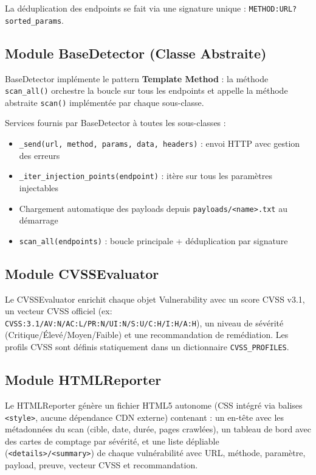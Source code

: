 \documentclass[12pt,a4paper]{report}
\newcommand{\code}[1]{\texttt{#1}}
\begin{document}
La déduplication des endpoints se fait via une signature unique :
\code{METHOD:URL?sorted\_params}.

\subsection{Module BaseDetector (Classe Abstraite)}

BaseDetector implémente le pattern \textbf{Template Method} : la méthode \code{scan\_all()}
orchestre la boucle sur tous les endpoints et appelle la méthode abstraite \code{scan()}
implémentée par chaque sous-classe.

Services fournis par BaseDetector à toutes les sous-classes :
\begin{itemize}
  \item \code{\_send(url, method, params, data, headers)} : envoi HTTP avec gestion des erreurs
  \item \code{\_iter\_injection\_points(endpoint)} : itère sur tous les paramètres injectables
  \item Chargement automatique des payloads depuis \code{payloads/<name>.txt} au démarrage
  \item \code{scan\_all(endpoints)} : boucle principale + déduplication par signature
\end{itemize}

\subsection{Module CVSSEvaluator}

Le CVSSEvaluator enrichit chaque objet Vulnerability avec un score CVSS v3.1, un vecteur CVSS
officiel (ex: \code{CVSS:3.1/AV:N/AC:L/PR:N/UI:N/S:U/C:H/I:H/A:H}), un niveau de sévérité
(Critique/Élevé/Moyen/Faible) et une recommandation de remédiation. Les profils CVSS sont
définis statiquement dans un dictionnaire \code{CVSS\_PROFILES}.

\subsection{Module HTMLReporter}

Le HTMLReporter génère un fichier HTML5 autonome (CSS intégré via balises \code{<style>},
aucune dépendance CDN externe) contenant : un en-tête avec les métadonnées du scan (cible,
date, durée, pages crawlées), un tableau de bord avec des cartes de comptage par sévérité,
et une liste dépliable (\code{<details>/<summary>}) de chaque vulnérabilité avec URL, méthode,
paramètre, payload, preuve, vecteur CVSS et recommandation.
\end{document}
